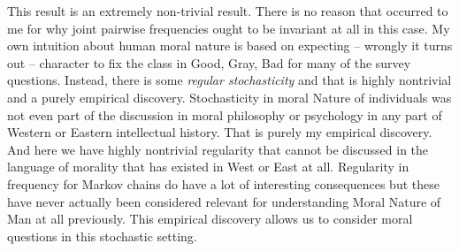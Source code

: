 \documentclass{amsart}
\begin{document}
This result is an extremely non-trivial result.  There is no reason that occurred to me  for why joint pairwise frequencies ought to be invariant at all in this case.  My own intuition about human moral nature is based on expecting -- wrongly it turns out -- character to fix the class in Good, Gray, Bad for many of the survey questions.  Instead, there is some {\em regular stochasticity} and that is highly nontrivial and a purely empirical discovery.  Stochasticity in moral Nature of individuals was not even part of the discussion in moral philosophy or psychology in any part of Western or Eastern intellectual history.  That is purely my empirical discovery.  And here we have highly nontrivial regularity that cannot be discussed in the language of morality that has existed in West or East at all.  Regularity in frequency for Markov chains do have a lot of interesting consequences but these have never actually been considered relevant for understanding Moral Nature of Man at all previously.  This empirical discovery allows us to consider moral questions in this stochastic setting.
\end{document}

